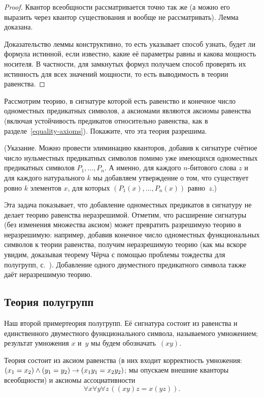 \begin{proof}
Квантор всеобщности рассматривается точно так же (а можно его
выразить через квантор существования и вообще не рассматривать).
Лемма доказана.

Доказательство леммы конструктивно, то есть указывает способ
узнать, будет ли формула истинной, если известно, какие её параметры
равны и какова мощность носителя. В частности, для замкнутых формул
получаем способ проверять их истинность для всех значений мощности,
то есть выводимость в теории равенства.
\end{proof}

\begin{problem}
        \label{unary-equality}
Рассмотрим теорию, в сигнатуре которой есть равенство и конечное
число одноместных предикатных символов, а аксиомами являются
аксиомы равенства (включая устойчивость предикатов относительно
равенства, как в разделе~\ref{equality-axioms}).
Покажите, что эта теория разрешима.

(Указание. Можно провести элиминацию кванторов, добавив к
сигнатуре счётное число нульместных предикатных символов помимо
уже имеющихся одноместных предикатных символов $P_1,\ldots,P_n$.
А именно, для каждого $n$-битового слова $z$ и для каждого
натурального $k$ мы добавляем утверждение о том, что существует
ровно $k$ элементов $x$, для которых $(P_1(x),\ldots,P_n(x))$
равно~$z$.)
\end{problem}

Эта задача показывает, что добавление одноместных предикатов в
сигнатуру не делает теорию равенства неразрешимой. Отметим, что
расширение сигнатуры (без изменения множества аксиом) может
превратить разрешимую теорию в неразрешимую: например, добавив
конечное число одноместных функциональных символов к теории
равенства, получим неразрешимую теорию (как мы вскоре увидим,
доказывая теорему Чёрча с помощью проблемы тождества для
полугрупп, с.~\pageref{church-theorem}). Добавление одного
двуместного предикатного символа также даёт неразрешимую теорию.

\subsection*{Теория полугрупп}

Наш второй пример\т теория полугрупп.%
Её сигнатура состоит из
равенства и единственного двуместного функционального символа,
называемого умножением; результат умножения $x$ и~$y$ мы будем
обозначать~$(xy)$.

Теория состоит из аксиом равенства (в них входит корректность
умножения: $(x_1\hm=x_2)\hm\land (y_1\hm=y_2) \hm\to
(x_1y_1\hm=x_2y_2)$; мы опускаем внешние кванторы всеобщности) и
аксиомы ассоциативности
        $$
\forall x \forall y \forall z \,  ((xy)z=x(yz)).
        $$

